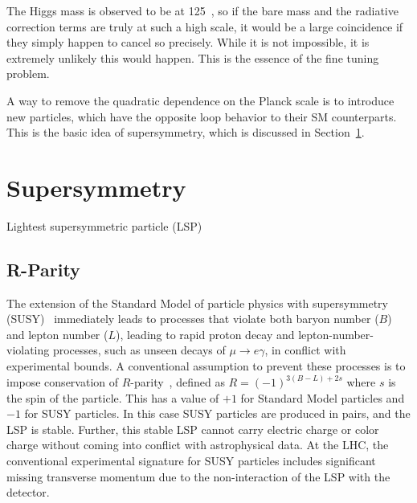The Higgs mass is observed to be at 125~\GeV, so if the bare mass and the
radiative correction terms are truly at such a high scale, it would be a large
coincidence if they simply happen to cancel so precisely.
While it is not impossible, it is extremely unlikely this would happen.
This is the essence of the fine tuning problem.

A way to remove the quadratic dependence on the Planck scale is to introduce
new particles, which have the opposite loop behavior to their SM counterparts.
This is the basic idea of supersymmetry, which is discussed in
Section~\ref{sec:susy}.

\FloatBarrier
\section{Supersymmetry}
\label{sec:susy}

Lightest supersymmetric particle (LSP) 

\subsection{R-Parity}
\label{sec:r_parity}

The extension of the Standard Model of particle physics with
supersymmetry (SUSY)~\cite{Miyazawa:1966,Ramond:1971gb,Golfand:1971iw,
Neveu:1971rx,Neveu:1971iv,Gervais:1971ji,Volkov:1973ix,Wess:1973kz,Wess:1974tw}
immediately leads to processes that violate both baryon number ($B$) and
lepton number ($L$), leading to rapid proton decay and
lepton-number-violating processes, such as unseen decays of
$\mu \to e\gamma$, in conflict with experimental bounds.
A conventional assumption to prevent these processes is to impose
conservation of $R$-parity~\cite{Fayet:1976et,Fayet:1977yc,Farrar:1978xj,
Fayet:1979sa,Dimopoulos:1981zb},
defined as $R=(-1)^{3(B-L)+2s}$ where $s$ is the spin of the particle.
This has a value of $+1$ for Standard Model particles and $-1$ for
SUSY particles.
In this case SUSY particles are produced in pairs, and the LSP is stable.
Further, this stable LSP cannot carry electric charge or color charge without
coming into conflict with astrophysical data.
At the LHC, the conventional experimental signature for SUSY particles
includes significant missing transverse momentum due to the non-interaction of
the LSP with the detector.

\FloatBarrier
